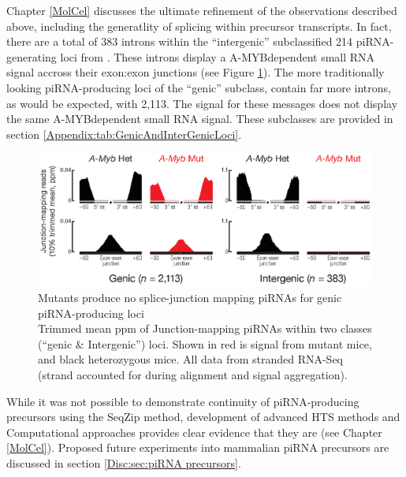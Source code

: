   Chapter \ref{MolCel} discusses the ultimate refinement of the observations described above, including the generatlity of splicing within precursor transcripts. In fact, there are a total of 383 introns within the ``intergenic'' subclassified 214 piRNA-generating loci from \citep{Li2013e}. These introns display a A-MYB\textendash dependent small RNA signal accross their exon:exon junctions (see Figure \ref{SeqZipMethod:fig: amyb makes SJ mapping}). The more traditionally looking piRNA-producing loci of the ``genic'' subclass, contain far more introns, as would be expected, with 2,113. The signal for these messages does not display the same A-MYB\textendash dependent small RNA signal. These subclasses are provided in section \ref{Appendix:tab:GenicAndInterGenicLoci}. 

  \begin{figure} %
    \centering 
    \includegraphics{Figures/SeqZipMethod/aggregatePiRNAsatSpliceJunctions.eps}
    \caption[\amyb{} Mutants produce no splice-junction mapping piRNAs for genic piRNA-producing loci]
    {
      \amyb{} Mutants produce no splice-junction mapping piRNAs for genic piRNA-producing loci\\[0.25cm]
      Trimmed mean ppm of Junction-mapping piRNAs within two classes (``genic \& Intergenic'') loci. Shown in red is signal from \amyb{} mutant mice, and black \amyb{} heterozygous mice. All data from stranded RNA-Seq (strand accounted for during alignment and signal aggregation).
      }
    \label{SeqZipMethod:fig: amyb makes SJ mapping}
    \end{figure}

  While it was not possible to demonstrate continuity of piRNA-producing precursors using the SeqZip method, development of advanced HTS methods and Computational approaches provides clear evidence that they are (see Chapter \ref{MolCel}). Proposed future experiments into mammalian piRNA precursors are discussed in section \ref{Disc:sec:piRNA precursors}.

\cleardoublepage